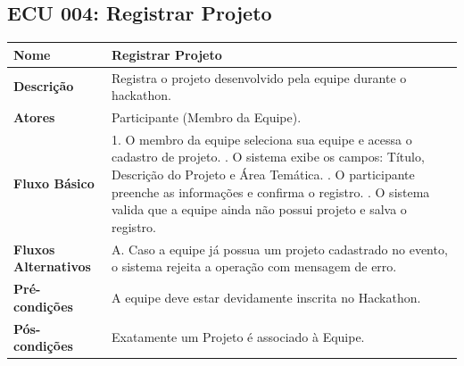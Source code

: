 \documentclass[12pt]{article}
\begin{document}
\subsection{ECU 004: Registrar Projeto}
\begin{table}[H]
\centering
\small
\begin{tabular}{|p{3.2cm}|p{11.5cm}|}
\hline
\textbf{Nome} & Registrar Projeto \\ \hline
\textbf{Descrição} & Registra o projeto desenvolvido pela equipe durante o hackathon. \\ \hline
\textbf{Atores} & Participante (Membro da Equipe). \\ \hline
\textbf{Fluxo Básico} & 
1. O membro da equipe seleciona sua equipe e acessa o cadastro de projeto. \newline
2. O sistema exibe os campos: Título, Descrição do Projeto e Área Temática. \newline
3. O participante preenche as informações e confirma o registro. \newline
4. O sistema valida que a equipe ainda não possui projeto e salva o registro. \\ \hline
\textbf{Fluxos Alternativos} & 
A. Caso a equipe já possua um projeto cadastrado no evento, o sistema rejeita a operação com mensagem de erro. \\ \hline
\textbf{Pré-condições} & A equipe deve estar devidamente inscrita no Hackathon. \\ \hline
\textbf{Pós-condições} & Exatamente um Projeto é associado à Equipe. \\ \hline
\end{tabular}
\end{table}
\end{document}
